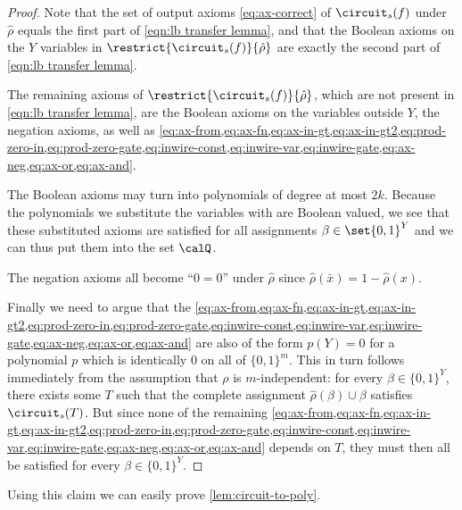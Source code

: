 \begin{proof}
  Note that the set of output axioms \eqref{eq:ax-correct} of
  $\circuit_s(f)$ under $\hat\rho$ equals the first part of
  \eqref{eqn:lb transfer lemma}, and that the Boolean axioms on the $Y$ variables in
  $\restrict{\circuit_s(f)}{\hat\rho}$ are exactly the second part
  of \eqref{eqn:lb transfer lemma}.

  The remaining axioms of $\restrict{\circuit_s(f)}{\hat\rho}$, which
  are not present in \eqref{eqn:lb transfer lemma}, are the Boolean
  axioms on the variables outside $Y$, the negation axioms, as well as
  \cref{eq:ax-from,eq:ax-fn,eq:ax-in-gt,eq:ax-in-gt2,eq:prod-zero-in,eq:prod-zero-gate,eq:inwire-const,eq:inwire-var,eq:inwire-gate,eq:ax-neg,eq:ax-or,eq:ax-and}.

  The Boolean axioms may turn into polynomials of degree at most
  $2k$. Because the polynomials we substitute the variables with are
  Boolean valued, we see that these substituted axioms are satisfied
  for all assignments $\beta \in \set{0,1}^Y$ and we can thus put them
  into the set $\calQ$.

  The negation axioms all become ``$0=0$'' under $\hat{\rho}$ since
  $\hat{\rho}(\bar{x}) = 1 - \hat{\rho}(x)$.
  
  Finally we need to argue that the
  \cref{eq:ax-from,eq:ax-fn,eq:ax-in-gt,eq:ax-in-gt2,eq:prod-zero-in,eq:prod-zero-gate,eq:inwire-const,eq:inwire-var,eq:inwire-gate,eq:ax-neg,eq:ax-or,eq:ax-and}
  are also of the form $p(Y)=0$ for a polynomial $p$ which is
  identically $0$ on all of $\{0,1\}^m$.  This in turn follows
  immediately from the assumption that $\rho$ is $m$-independent: for
  every $\beta \in \{0,1\}^Y$, there exists some $T$ such that the
  complete assignment $\hat\rho(\beta) \cup \beta$ satisfies
  $\circuit_s(T)$.  But since none of the remaining
  \cref{eq:ax-from,eq:ax-fn,eq:ax-in-gt,eq:ax-in-gt2,eq:prod-zero-in,eq:prod-zero-gate,eq:inwire-const,eq:inwire-var,eq:inwire-gate,eq:ax-neg,eq:ax-or,eq:ax-and}
  depends on $T$, they must then all be satisfied for every
  $\beta \in \{0,1\}^Y$.
\end{proof}

Using this claim we can easily prove \cref{lem:circuit-to-poly}.

